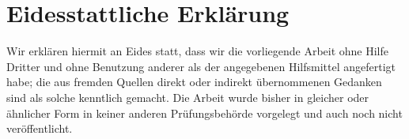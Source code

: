 \section*{Eidesstattliche Erklärung}

Wir erklären hiermit an Eides statt, dass wir die vorliegende Arbeit
ohne Hilfe Dritter und ohne Benutzung anderer als der angegebenen
Hilfsmittel angefertigt habe; die aus fremden Quellen direkt oder
indirekt übernommenen Gedanken sind als solche kenntlich gemacht. Die
Arbeit wurde bisher in gleicher oder ähnlicher Form in keiner anderen
Prüfungsbehörde vorgelegt und auch noch nicht veröffentlicht.

\vspace{1in}

\par\noindent\makebox[2.0in]{\hrulefill} \hfill\makebox[2.5in]{\hrulefill}%
\par\noindent{}      \hfill{}%